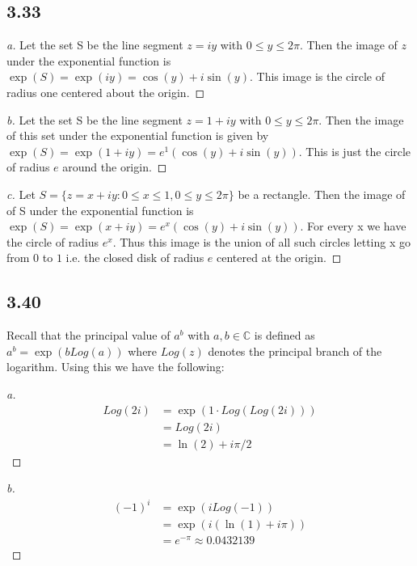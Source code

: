\documentclass[a4paper, 11pt]{article}
\begin{document}
\subsection*{3.33}
	\begin{proof}[a]
		Let the set S be the line segment $z=iy$ with $0\leq y \leq 2\pi$. Then the image of $z$ under the exponential function is $\exp(S) = \exp(iy) = \cos(y)+i\sin(y)$. This image is the circle of radius one centered about the origin. 
	\end{proof}
	
	\begin{proof}[b]
		Let the set S be the line segment $z=1+iy$ with $0\leq y \leq 2\pi$. Then the image of this set under the exponential function is given by $\exp(S) = \exp(1+iy) = e^1(\cos(y) + i\sin(y))$. This is just the circle of radius $e$ around the origin. 
	\end{proof}
	
	\begin{proof}[c]
		Let $S=\{z=x+iy:0\leq x\leq 1, 0\leq y \leq 2\pi \}$ be a rectangle. Then the image of of S under the exponential function is $\exp(S) = \exp(x+iy) = e^x(\cos(y)+i\sin(y))$. For every x we have the circle of radius $e^x$. Thus this image is the union of all such circles letting x go from $0$ to $1$ i.e. the closed disk of radius $e$ centered at the origin.  
	\end{proof}
		
\subsection*{3.40} 
	Recall that the principal value of $a^b$ with $a,b\in\mathbb{C}$ is defined as $a^b = \exp(bLog(a))$ where $Log(z)$ denotes the principal branch of the logarithm. Using this we have the following: 
	
	\begin{proof}[a]
		\begin{align*}
			Log(2i) &= \exp(1\cdot Log(Log(2i))) \\ 
				&= Log(2i) \\ 
				&= \ln(2) + i\pi/2 
		\end{align*}
	\end{proof}
	
	\begin{proof}[b]
		\begin{align*}
			(-1)^i &= \exp(iLog(-1)) \\ 
				&= \exp(i(\ln(1)+i\pi)) \\ 
				&= e^{-\pi} \approx 0.0432139 
		\end{align*}
	\end{proof}
	
\end{document}
